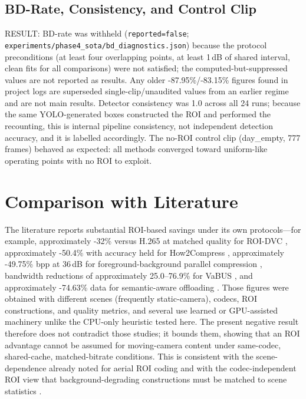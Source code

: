 \subsection{BD-Rate, Consistency, and Control Clip}

RESULT: BD-rate was withheld (\texttt{reported=false}; \texttt{experiments/phase4\_sota/bd\_diagnostics.json}) because the protocol preconditions (at least four overlapping points, at least 1\,dB of shared interval, clean fits for all comparisons) were not satisfied; the computed-but-suppressed values are not reported as results. Any older -87.95\%/-83.15\% figures found in project logs are superseded single-clip/unaudited values from an earlier regime and are not main results. Detector consistency was 1.0 across all 24 runs; because the same YOLO-generated boxes constructed the ROI and performed the recounting, this is internal pipeline consistency, not independent detection accuracy, and it is labelled accordingly. The no-ROI control clip (day\_empty, 777 frames) behaved as expected: all methods converged toward uniform-like operating points with no ROI to exploit.

\section{Comparison with Literature}

The literature reports substantial ROI-based savings under its own protocols---for example, approximately -32\% versus H.265 at matched quality for ROI-DVC \cite{Wu2024ROIDVC}, approximately -50.4\% with accuracy held for How2Compress \cite{Wu2025How2Compress}, approximately -49.75\% bpp at 36\,dB for foreground-background parallel compression \cite{Wu2020FGBG}, bandwidth reductions of approximately 25.0--76.9\% for VaBUS \cite{Wang2023VaBUS}, and approximately -74.63\% data for semantic-aware offloading \cite{Kadukar2026Semantic}. Those figures were obtained with different scenes (frequently static-camera), codecs, ROI constructions, and quality metrics, and several use learned or GPU-assisted machinery \cite{Wu2024ROIDVC,Zhao2025ASVC,Zhao2025TALC} unlike the CPU-only heuristic tested here. The present negative result therefore does not contradict those studies; it bounds them, showing that an ROI advantage cannot be assumed for moving-camera content under same-codec, shared-cache, matched-bitrate conditions. This is consistent with the scene-dependence already noted for aerial ROI coding \cite{Meuel2018Aerial} and with the codec-independent ROI view that background-degrading constructions must be matched to scene statistics \cite{CodecIndependent2016}.

